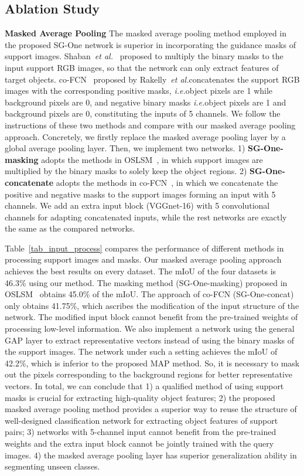 \documentclass[journal]{IEEEtran}
\newcommand{\etal}{\emph{et al.}}
\newcommand{\ie}{\emph{i.e.}}
\begin{document}
\subsection{Ablation Study}\label{ablation}
\noindent \textbf{Masked Average Pooling}
The masked average pooling method employed in the proposed SG-One network is superior in incorporating the guidance masks of support images. 
Shaban~\etal~\cite{shaban2017one} proposed to multiply the binary masks to the input support RGB images, so that the network can only extract features of target objects.
co-FCN~\cite{rakelly2018conditional} proposed by Rakelly~\etal concatenates the support RGB images with the corresponding positive masks, \ie object pixels are 1 while background pixels are 0, and negative binary masks \ie object pixels are 1 and background pixels are 0, constituting the inputs of 5 channels.
We follow the instructions of these two methods and compare with our masked average pooling approach.
Concretely, we firstly replace the masked average pooling layer by a global average pooling layer.
Then, we implement two networks.
1) \textbf{SG-One-masking} adopts the methods in OSLSM~\cite{shaban2017one}, in which support images are multiplied by the binary masks to solely keep the object regions. 
2) \textbf{SG-One-concatenate} adopts the methods in co-FCN~\cite{rakelly2018conditional}, in which we concatenate the positive and negative masks to the support images forming an input with 5 channels. 
We add an extra input block (VGGnet-16) with 5 convolutional channels for adapting concatenated inputs, while the rest networks are exactly the same as the compared networks.



Table~\ref{tab_input_process} compares the performance of different methods in processing support images and masks.
Our masked average pooling approach achieves the best results on every dataset.
The mIoU of the four datasets is 46.3\% using our method.
The masking method (SG-One-masking) proposed in OSLSM~\cite{shaban2017one} obtains 45.0\% of the mIoU.
The approach of co-FCN (SG-One-concat) only obtains 41.75\%, which ascribes the modification of the input structure of the network.
The modified input block cannot benefit from the pre-trained weights of processing low-level information.
We also implement a network using the general GAP layer to extract representative vectors instead of using the binary masks of the support images.
The network under such a setting achieves the mIoU of 42.2\%, which is inferior to the proposed MAP method.
So, it is necessary to mask out the pixels corresponding to the background regions for better representative vectors.
In total, we can conclude that 
1) a qualified method of using support masks is crucial for extracting high-quality object features; 
2) the proposed masked average pooling method provides a superior way to reuse the structure of well-designed classification network for extracting object features of support pairs;
3) networks with 5-channel input cannot benefit from the pre-trained weights and the extra input block cannot be jointly trained with the query images.
4) the masked average pooling layer has superior generalization ability in segmenting unseen classes.
\end{document}
